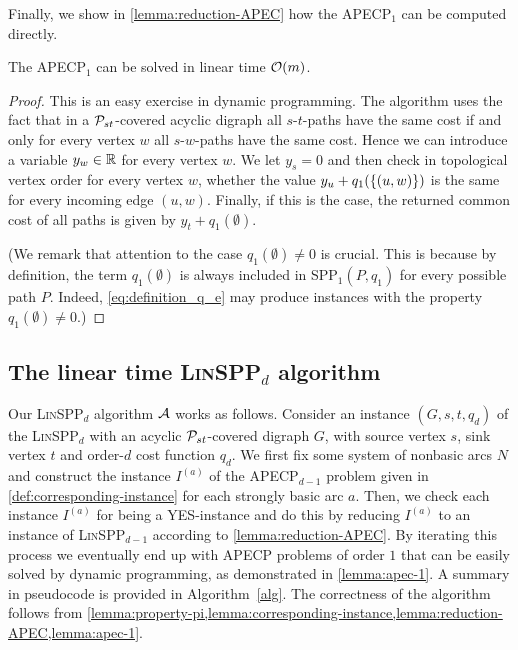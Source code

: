 Finally, we show in \cref{lemma:reduction-APEC} how the APECP$_1$ can be computed directly.
\begin{lemma}
\label{lemma:apec-1}
    The APECP$_1$ can be solved in linear time $\mathcal{O}(m)$.
\end{lemma}
\begin{proof}
    This is an easy exercise in dynamic programming. The algorithm uses the fact that in a $\mathcal{P}_{st}$-covered acyclic digraph all $s$-$t$-paths have the same cost if and only for every vertex $w$ all $s$-$w$-paths have the same cost. Hence we can introduce a variable $y_w \in \mathbb{R}$ for every vertex $w$. We let $y_s = 0$ and then check in topological vertex order for every vertex $w$, whether the value $y_u + q_1(\{ (u,w) \})$ is the same for every incoming edge $(u, w)$. Finally, if this is the case, the returned common cost of all paths is given by $y_t + q_1(\emptyset)$.
    
    (We remark that attention to the case $q_1(\emptyset) \neq 0$ is crucial. This is because by definition, the term $q_1(\emptyset)$ is always included in SPP$_1(P, q_1)$ for every possible path $P$. Indeed, \cref{eq:definition_q_e} may produce instances with the property $q_1(\emptyset) \neq 0$.)
\end{proof}


\subsection{The linear time \textsc{Lin}SPP$_d$ algorithm}
\label{subsection:alg}
Our \textsc{Lin}SPP$_d$ algorithm ${\cal A}$ works as follows.
Consider an instance $(G,s,t,q_d)$ of the \textsc{Lin}SPP$_d$ with an acyclic $\mathcal{P}_{st}$-covered digraph $G$, with source vertex $s$, sink vertex $t$ and order-$d$ cost function $q_d$. We first fix some system of nonbasic arcs $N$ and construct the instance $I^{(a)}$ of the  APECP$_{d-1}$ problem given in \cref{def:corresponding-instance} for each strongly basic arc $a$. 
Then,  we  check each instance  $I^{(a)}$ for being a  \textsc{YES}-instance and
do this by reducing  $I^{(a)}$  to  an instance of \textsc{Lin}SPP$_{d-1}$ according to \cref{lemma:reduction-APEC}.
By iterating this process we eventually end up with APECP problems of order $1$ that can be easily solved by  dynamic programming, as demonstrated in \cref{lemma:apec-1}. A summary in pseudocode is provided in Algorithm~\ref{alg}. The correctness of the algorithm follows from \cref{lemma:property-pi,lemma:corresponding-instance,lemma:reduction-APEC,lemma:apec-1}.

